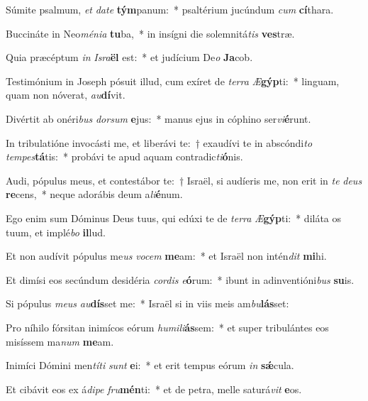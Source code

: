 \item Súmite psalmum, \textit{et} \textit{da}\textit{te} \textbf{tým}panum:~* psaltérium jucúndum \textit{cum} \textbf{cí}thara.
\item Buccináte in Neo\textit{mé}\textit{ni}\textit{a} \textbf{tu}ba,~* in insígni die solemnitá\textit{tis} \textbf{ves}træ.
\item Quia præcéptum \textit{in} \textit{Is}\textit{ra}\textbf{ël} est:~* et judícium De\textit{o} \textbf{Ja}cob.
\item Testimónium in Joseph pósuit illud, cum exíret de \textit{ter}\textit{ra} \textit{Æ}\textbf{gýp}ti:~* linguam, quam non nóverat, \textit{au}\textbf{dí}vit.
\item Divértit ab onéri\textit{bus} \textit{dor}\textit{sum} \textbf{e}jus:~* manus ejus in cóphino ser\textit{vi}\textbf{é}runt.
\item In tribulatióne invocásti me, et liberávi te:~† exaudívi te in abscóndi\textit{to} \textit{tem}\textit{pes}\textbf{tá}tis:~* probávi te apud aquam contradic\textit{ti}\textbf{ó}nis.
\item Audi, pópulus meus, et contestábor te:~† Israël, si audíeris me, non erit in \textit{te} \textit{de}\textit{us} \textbf{re}cens,~* neque adorábis deum a\textit{li}\textbf{é}num.
\item Ego enim sum Dóminus Deus tuus, qui edúxi te de \textit{ter}\textit{ra} \textit{Æ}\textbf{gýp}ti:~* diláta os tuum, et implé\textit{bo} \textbf{il}lud.
\item Et non audívit pópulus me\textit{us} \textit{vo}\textit{cem} \textbf{me}am:~* et Israël non intén\textit{dit} \textbf{mi}hi.
\item Et dimísi eos secúndum desidéria \textit{cor}\textit{dis} \textit{e}\textbf{ó}rum:~* ibunt in adinventióni\textit{bus} \textbf{su}is.
\item Si pópulus \textit{me}\textit{us} \textit{au}\textbf{dís}set me:~* Israël si in viis meis am\textit{bu}\textbf{lás}set:
\item Pro níhilo fórsitan inimícos eórum \textit{hu}\textit{mi}\textit{li}\textbf{ás}sem:~* et super tribulántes eos misíssem ma\textit{num} \textbf{me}am.
\item Inimíci Dómini men\textit{tí}\textit{ti} \textit{sunt} \textbf{e}i:~* et erit tempus eórum \textit{in} \textbf{sǽ}cula.
\item Et cibávit eos ex á\textit{di}\textit{pe} \textit{fru}\textbf{mén}ti:~* et de petra, melle saturá\textit{vit} \textbf{e}os.
